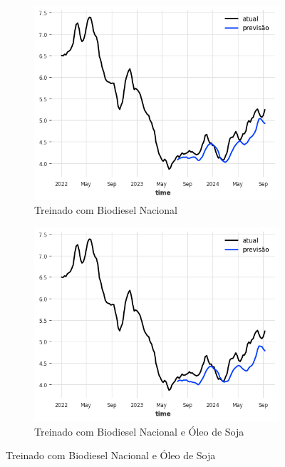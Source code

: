 \begin{figure}[htbp]
	\centering
	\begin{subfigure}[b]{0.45\textwidth}
		\centering
		\includegraphics[width=\textwidth]{figuras/nhits_brasil_plot.png} %
		\caption{Treinado com Biodiesel Nacional \newline}
		\label{fig:nhits_brasil_plot}
	\end{subfigure}
	\hfill
	\begin{subfigure}[b]{0.45\textwidth}
		\centering
		\includegraphics[width=\textwidth]{figuras/nhits_brasil_oil_plot.png} %
		\caption{Treinado com Biodiesel Nacional e Óleo de Soja}
		\label{fig:nhits_brasil_oil_plot}
	\end{subfigure}


\end{figure}
